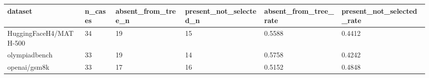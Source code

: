 \begin{tabular}{llllll}
\hline
dataset & n_cases & absent_from_tree_n & present_not_selected_n & absent_from_tree_rate & present_not_selected_rate \\
\hline
HuggingFaceH4/MATH-500 & 34 & 19 & 15 & 0.5588 & 0.4412 \\
olympiadbench & 33 & 19 & 14 & 0.5758 & 0.4242 \\
openai/gsm8k & 33 & 17 & 16 & 0.5152 & 0.4848 \\
\hline
\end{tabular}
